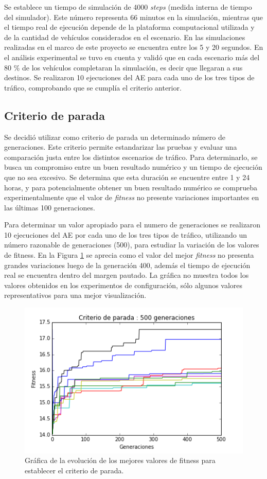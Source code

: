 Se establece un tiempo de simulación de 4000 \emph{steps} (medida interna de tiempo del simulador). Este número representa 66 minutos en la simulación, mientras que el tiempo real de ejecución depende de la plataforma computacional utilizada y de la cantidad de vehículos considerados en el escenario. En las simulaciones realizadas en el marco de este proyecto se encuentra entre los 5 y 20 segundos. En el análisis experimental se tuvo en cuenta y validó que en cada escenario más del 80 \% de los vehículos completaran la simulación, es decir que llegaran a sus destinos. Se realizaron 10 ejecuciones del AE para cada uno de los tres tipos de tráfico, comprobando que se cumplía el criterio anterior.


\subsection{Criterio de parada}
Se decidió utilizar como criterio de parada un determinado número de generaciones. Este criterio permite estandarizar las pruebas y evaluar una comparación justa entre los distintos escenarios de tráfico. Para determinarlo, se busca un compromiso entre un buen resultado numérico y un tiempo de ejecución que no sea excesivo. Se determina que esta duración se encuentre entre 1 y 24 horas, y para potencialmente obtener un buen resultado numérico se comprueba experimentalmente que el valor de \emph{fitness} no presente variaciones importantes en las últimas 100 generaciones.  

Para determinar un valor apropiado para el numero de generaciones se realizaron 10 ejecuciones del AE por cada uno de los tres tipos de tráfico, utilizando un número razonable de generaciones (500), para estudiar la variación de los valores de fitness. En la Figura \ref{fig:criterio_parada} se aprecia como el valor del mejor \emph{fitness} no presenta grandes variaciones luego de la generación 400, además el tiempo de ejecución real se encuentra dentro del margen pautado. La gráfica no muestra todos los valores obtenidos en los experimentos de configuración, sólo algunos valores representativos para una mejor visualización.

\begin{figure}[h]
\centering
\includegraphics[width=0.8\linewidth]{Figures/criterio_parada}
\caption[Gráfica de la evolución de los valores de fitness. ]{Gráfica de la evolución de los mejores valores de fitness para establecer el criterio de parada.}
\label{fig:criterio_parada}
\end{figure}

